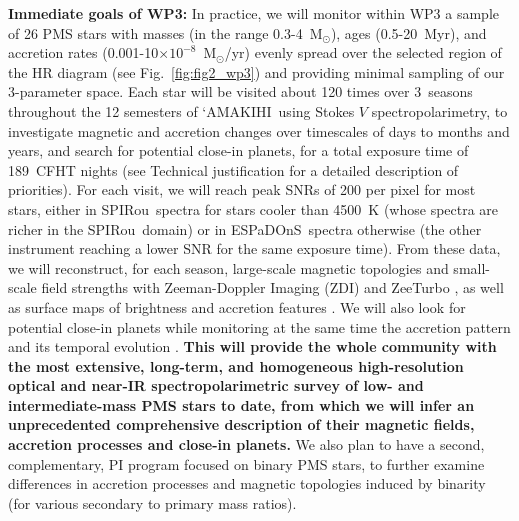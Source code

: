 \documentclass[
    traditabstract,
    longauth,
    onecolumn,
]{aa}
\def \amakihi{`AMAKIHI}
\def \MS{M$_{\odot}$}
\def \spi{SPIRou}
\def \esp{ESPaDOnS}
\begin{document}
{\bf \noindent Immediate goals of WP3:} In practice, we will monitor within WP3 a sample of 26 PMS stars with masses (in the range 0.3-4~\MS), ages (0.5-20~Myr), and accretion rates (0.001-10$\times10^{-8}$~\MS/yr) evenly spread over the selected region of the HR diagram (see Fig.~\ref{fig:fig2_wp3}) and providing minimal sampling of our 3-parameter space.  Each star will be visited about 120 times over 3~seasons throughout the 12 semesters of \amakihi\ using Stokes $V$ spectropolarimetry, to investigate magnetic and accretion changes over timescales of days to months and years, and search for potential close-in planets, for a total exposure time of 189~CFHT nights (see Technical justification for a detailed description of priorities).  For each visit, we will reach peak SNRs of 200 per pixel for most stars, either in \spi\ spectra for stars cooler than 4500~K (whose spectra are richer in the \spi\ domain) or in \esp\ spectra otherwise (the other instrument reaching a lower SNR for the same exposure time).  From these data, we will reconstruct, for each season, large-scale magnetic topologies and small-scale field strengths with Zeeman-Doppler Imaging (ZDI) and ZeeTurbo \citep{Donati2006,Cristofari2025}, as well as surface maps of brightness and accretion features \citep[as in, e.g.,][]{Donati2024b}.  We will also  look for potential close-in planets \citep{Finociety2023,Zaire2024} while monitoring at the same time the accretion pattern and its temporal evolution \citep{Bouvier2023,Sousa2023}.  {\bf This will provide the whole community with the most extensive, long-term, and homogeneous high-resolution optical and near-IR spectropolarimetric survey of low- and intermediate-mass PMS stars to date, from which we will infer an unprecedented comprehensive description of their magnetic fields, accretion processes and close-in planets. }  We also plan to have a second, complementary, PI program focused on binary PMS stars, to further examine differences in accretion processes and magnetic topologies induced by binarity (for various secondary to primary mass ratios).
\end{document}
